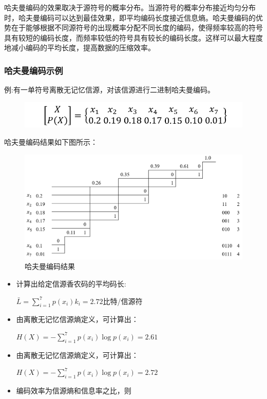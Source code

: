 \begin{multicols}{2}
哈夫曼编码的效果取决于源符号的概率分布。当源符号的概率分布接近均匀分布时，哈夫曼编码可以达到最佳效果，即平均编码长度接近信息熵。哈夫曼编码的优势在于能够根据不同源符号的出现概率分配不同长度的编码，使得频率较高的符号具有较短的编码长度，而频率较低的符号具有较长的编码长度。这样可以最大程度地减小编码的平均长度，提高数据的压缩效率。

\subsubsection{哈夫曼编码示例}
\noindent 例:有一单符号离散无记忆信源，对该信源进行二进制哈夫曼编码。
\begin{figure}[H]
	\centering
	\includegraphics[width=0.95\linewidth]{px}
	\label{fig:px}
\end{figure}
哈夫曼编码结果如下图所示：
\begin{figure}[H]
	\centering
	\includegraphics[width=0.95\linewidth]{pics/xian1}
	\caption{哈夫曼编码结果}
	\label{fig:xian1}
\end{figure}
\begin{itemize}
	\item 计算出给定信源香农码的平均码长:
	
	$\bar{L}=\sum_{i=1}^{7} p\left(x_{i}\right) k_{i}=2.72$比特/信源符
	
	\item 由离散无记忆信源熵定义，可计算出：
	
	$H(X)=-\sum_{i=1}^{7} p\left(x_{i}\right) \log p\left(x_{i}\right)=2.61$
	
	\item 由离散无记忆信源熵定义，可计算出：
	
	$H(X)=-\sum_{i=1}^{7} p\left(x_{i}\right) \log p\left(x_{i}\right)=2.72$
	\item 编码效率为信源熵和信息率之比，则
	

\end{itemize}
\end{multicols}
